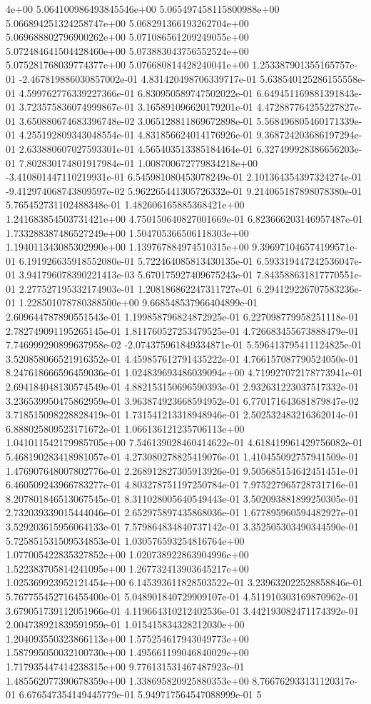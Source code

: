 4e+00	5.064100986493845546e+00	5.065497458115800988e+00	5.066894251324258747e+00	5.068291366193262704e+00	5.069688802796900262e+00	5.071086561209249055e+00	5.072484641504428460e+00	5.073883043756552524e+00	5.075281768039774377e+00	5.076680814428240041e+00
1.253387901355165757e-01	-2.467819886030857002e-01	4.831420498706339717e-01	5.638540125286155558e-01	4.599762776339227366e-01	6.830950589747502022e-01	6.649451169881391843e-01	3.723575836074999867e-01	3.165891096620179201e-01	4.472887764255227827e-01	3.650880674683396748e-02	3.065128811869672898e-01	5.568496805460171339e-01	4.255192809343048554e-01	4.831856624014176926e-01	9.368724203686197294e-01	2.633880607027593301e-01	4.565403513385184464e-01	6.327499928386656203e-01	7.802830174801917984e-01	1.008700672779834218e+00	-3.410801447110219931e-01	6.545981080453078249e-01	2.101364354397324274e-01	-9.412974068743809597e-02	5.962265441305726332e-01	9.214065187898078380e-01	5.765452731102488348e-01	1.482606165885368421e+00	1.241683854503731421e+00	4.750150640827001669e-01	6.823666203146957487e-01	1.733288387486527249e+00	1.504705366506118303e+00	1.194011343085302990e+00	1.139767884974510315e+00	9.396971046574199571e-01	6.191926635918552080e-01	5.722464085813430135e-01	6.593319447242536047e-01	3.941796078390221413e-03	5.670175927409675243e-01	7.843588631817770551e-01	2.277527195332174903e-01	1.208186862247311727e-01	6.294129226707583236e-01	1.228501078780388500e+00	9.668548537966404899e-01	2.609644787890551543e-01	1.199858796824872925e-01	6.227098779958251118e-01	2.782749091195265145e-01	1.811760527253479525e-01	4.726683455673888479e-01	7.746999290899637958e-02	-2.074375961849334871e-01	5.596413795411124825e-01	3.520858066521916352e-01	4.459857612791435222e-01	4.766157087790524050e-01	8.247618666596459036e-01	1.024839693486039094e+00	4.719927072178773941e-01	2.694184048130574549e-01	4.882153150696590393e-01	2.932631223037517332e-01	3.236539950475862959e-01	3.963874923668594952e-01	6.770171643681879847e-02	3.718515098228828419e-01	1.731541213318948946e-01	2.502532483216362014e-01	6.888025809523171672e-01	1.066136121235706113e+00	1.041011542179985705e+00	7.546139028460414622e-01	4.618419961429756082e-01	5.468190283418981057e-01	4.273080278825419076e-01	1.410455092757941509e-01	1.476907648007802776e-01	2.268912827305913926e-01	9.505685154642451451e-01	6.460509243966783277e-01	4.803278751197250784e-01	7.975227965728731716e-01	8.207801846513067545e-01	8.311028005640549443e-01	3.502093881899250305e-01	2.732039339015444046e-01	2.652975897435868036e-01	1.677895960594482927e-01	3.529203615956064133e-01	7.579864834840737142e-01	3.352505303490344590e-01	5.725851531509534853e-01	1.030576593254816764e+00	1.077005422835327852e+00	1.020738922863904996e+00	1.522383705814241095e+00	1.267732413903645217e+00	1.025369923952121454e+00	6.145393611828503522e-01	3.239632022528858846e-01	5.767755452716455400e-01	5.048901840729909107e-01	4.511910303169870962e-01	3.679051739112051966e-01	4.119664310212402536e-01	3.442193082471174392e-01	2.004738921839591959e-01	1.015415834328212030e+00	1.204093550323866113e+00	1.575254617943049773e+00	1.587995050032100730e+00	1.495661199046840029e+00	1.717935447414238315e+00	9.776131531467487923e-01	1.485562077390678359e+00	1.338695820925880353e+00	8.766762933131120317e-01	6.676547354149445779e-01	5.949717564547088999e-01	5